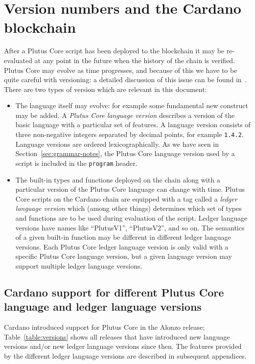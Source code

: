 \section{Version numbers and the Cardano blockchain}
\label{appendix:version-numbers}
After a Plutus Core script has been deployed to the blockchain it may be
re-evaluated at any point in the future when the history of the chain is
verified.  Plutus Core may evolve as time progresses, and because of this we
have to be quite careful with versioning: a detailed discussion of this issue
can be found in~\cite{CIP-35}.  There are two types of version which are
relevant in this document:

\begin{itemize}
\item The language itself may evolve: for example some fundamental new construct
  may be added.  A \textit{Plutus Core language version} describes a version of
  the basic language with a particular set of features. A language version
  consists of three non-negative integers separated by decimal points, for
  example \texttt{1.4.2}.  Language versions are ordered lexicographically.  As
  we have seen in Section~\ref{sec:grammar-notes}, the Plutus Core
  language version used by a script is included in the \texttt{program} header.
  
\item The built-in types and functions deployed on the chain along with a
  particular version of the Plutus Core language can change with time.  Plutus
  Core scripts on the Cardano chain are equipped with a tag called a
  \textit{ledger language version} which (among other things) determines which
  set of types and functions are to be used during evaluation of the script.
  Ledger language versions have names like ``PlutusV1'', ``PlutusV2'',
  and so on.  The semantics of a given built-in function may be different in
  different ledger language versions.  Each Plutus Core ledger language version
  is only valid with a specific Plutus Core language version, but a given
  language version may support multiple ledger language versions.
\end{itemize}

\subsection{Cardano support for different Plutus Core language and ledger language versions}

Cardano introduced support for Plutus Core in the Alonzo release;
Table~\ref{table:versions} shows all releases that have introduced new language
versions and/or new ledger language versions since then.  The features provided
by the different ledger language versions are described in subsequent appendices.

